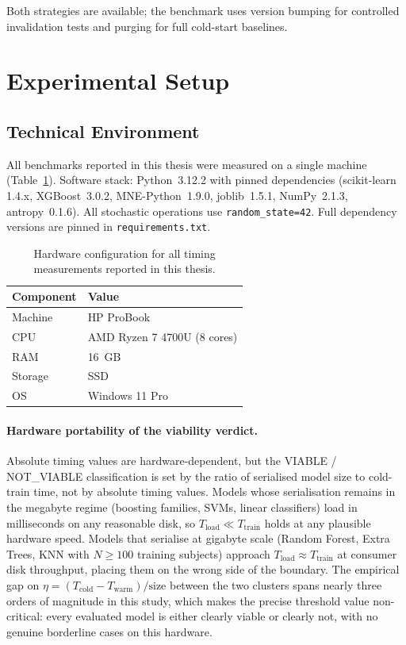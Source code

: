 Both strategies are available; the benchmark uses version bumping for
controlled invalidation tests and purging for full cold-start baselines.

\section{Experimental Setup}
\label{sec:experiment_setup}

\subsection{Technical Environment}

All benchmarks reported in this thesis were measured on a single machine
(Table~\ref{tab:hardware_env}). Software stack: Python~3.12.2 with pinned
dependencies (scikit-learn 1.4.x, XGBoost~3.0.2, MNE-Python~1.9.0,
joblib~1.5.1, NumPy~2.1.3, antropy~0.1.6). All stochastic operations use
\texttt{random\_state=42}. Full dependency versions are pinned in
\texttt{requirements.txt}.

\begin{table}[htbp]
\centering
\caption[Hardware used for all benchmarks in this thesis]{Hardware
configuration for all timing measurements reported in this thesis.}
\label{tab:hardware_env}
\begin{tabular}{ll}
\toprule
\textbf{Component} & \textbf{Value} \\
\midrule
Machine & HP ProBook \\
CPU & AMD Ryzen 7 4700U (8 cores) \\
RAM & 16~GB \\
Storage & SSD \\
OS & Windows 11 Pro \\
\bottomrule
\end{tabular}
\end{table}

\paragraph{Hardware portability of the viability verdict.}
Absolute timing values are hardware-dependent, but the VIABLE / NOT\_VIABLE
classification is set by the ratio of serialised model size to cold-train
time, not by absolute timing values. Models whose serialisation remains in
the megabyte regime (boosting families, SVMs, linear classifiers) load in
milliseconds on any reasonable disk, so $T_\text{load} \ll T_\text{train}$
holds at any plausible hardware speed. Models that serialise at gigabyte
scale (Random Forest, Extra Trees, KNN with $N\geq 100$ training subjects)
approach $T_\text{load} \approx T_\text{train}$ at consumer disk throughput,
placing them on the wrong side of the boundary. The empirical gap on
$\eta = (T_\text{cold} - T_\text{warm})/\text{size}$ between the two
clusters spans nearly three orders of magnitude in this study, which makes
the precise threshold value non-critical: every evaluated model is either
clearly viable or clearly not, with no genuine borderline cases on this
hardware.

